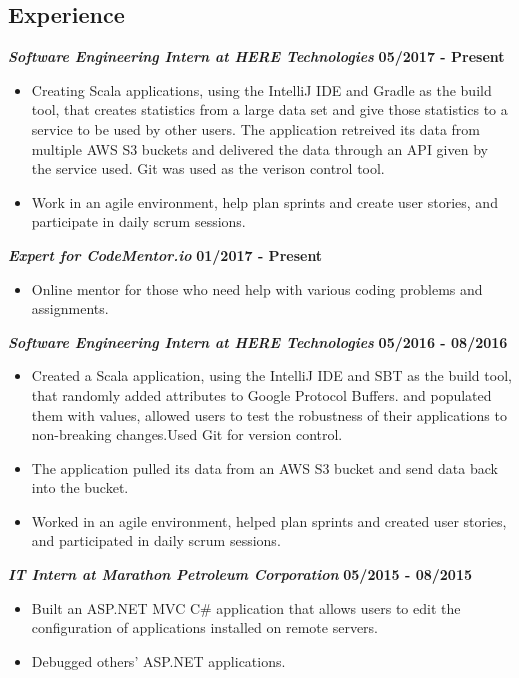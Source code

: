 \documentclass[10pt]{res}
\begin{document}
\begin{resume}
\section{Experience}
	\textbf{\textit{Software Engineering Intern at HERE Technologies}}
	\vspace*{.25em}
	\hfill{\bf 05/2017 - Present}
	\begin{itemize}
		\item Creating Scala applications, using the IntelliJ IDE and Gradle as the build tool, that creates statistics from a large data set and give those statistics to a service to be used by other users. The application retreived its data from multiple AWS S3 buckets and delivered the data through an API given by the service used. Git was used as the verison control tool. 
\item Work in an agile environment, help plan sprints and create user stories, and participate in daily scrum sessions. 
	\end{itemize}
\textbf{\textit{Expert for CodeMentor.io}}
	\vspace*{.25em}
	\hfill{\bf 01/2017 - Present}
	\begin{itemize}
		\item Online mentor for those who need help with various coding problems and assignments. 
	\end{itemize}
	\textbf{\textit{Software Engineering Intern at HERE Technologies}}
	\vspace*{.25em}
	\hfill {\bf 05/2016 - 08/2016}
	\begin{itemize}
	  \item Created a Scala application, using the IntelliJ IDE and SBT as the build tool, that randomly added attributes to Google Protocol Buffers. 
 and populated them with values, allowed users to test the robustness of their applications to non-breaking changes.Used Git for version control. 
	\item The application pulled its data from an AWS S3 bucket and send data back into the bucket.
\item Worked in an agile environment, helped plan sprints and created user stories, and participated in daily scrum sessions. 
	\end{itemize}  
	\textbf{\textit{IT Intern at Marathon Petroleum Corporation}} \hfill {\bf 05/2015 - 08/2015}
	\vspace*{.25em}
	\begin{itemize}
  \setlength\itemsep{0em}
	  \item Built an ASP.NET MVC C\# application that allows users to edit the configuration of applications installed on remote servers.
	  \item Debugged others' ASP.NET applications.
\end{itemize}


\end{resume}
\end{document}
